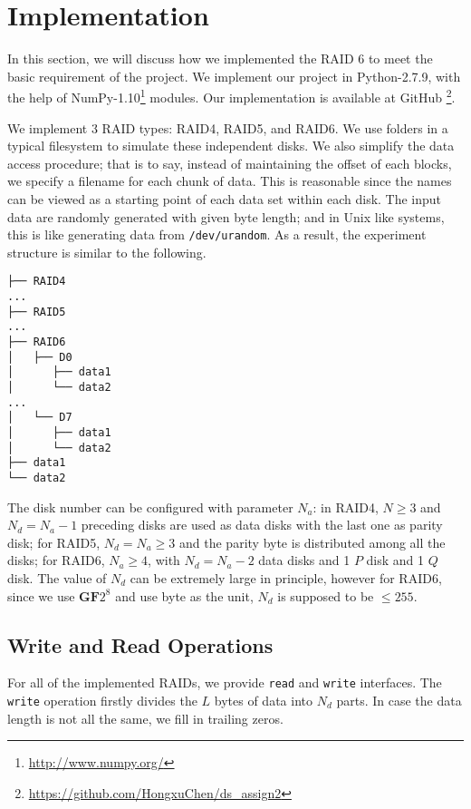\section{Implementation}

In this section, we will discuss how we implemented the RAID 6 to meet the basic requirement of the project.
We implement our project in Python-2.7.9, with the help of NumPy-1.10\footnote{\url{http://www.numpy.org/}} modules. Our implementation is available at GitHub \footnote{\url{https://github.com/HongxuChen/ds_assign2}}.

We implement 3 RAID types: RAID4, RAID5, and RAID6. We use folders in a typical filesystem to simulate these independent disks. We also simplify the data access procedure; that is to say, instead of maintaining the offset of each blocks, we specify a filename for each chunk of data. This is reasonable since the names can be viewed as a starting point of each data set within each disk. The input data are randomly generated with given byte length; and in Unix like systems, this is like generating data from \verb|/dev/urandom|. As a result, the experiment structure is similar to the following.

\begin{verbatim}
├── RAID4
...
├── RAID5
...
├── RAID6
│   ├── D0
│      ├── data1
│      └── data2
...
│   └── D7
│      ├── data1
│      └── data2
├── data1
└── data2

\end{verbatim}

The disk number can be configured with parameter $N_{a}$: in RAID4, $N\ge 3$ and $N_{d}=N_{a}-1$ preceding disks are used as data disks with the last one as parity disk; for RAID5, $N_{d}=N_{a}\ge 3$ and the parity byte is distributed among all the disks;  for RAID6, $N_{a}\ge 4$, with $N_{d}=N_{a}-2$ data disks and 1 $P$ disk and 1 $Q$ disk. The value of $N_{d}$ can be extremely large in principle, however for RAID6, since we use $\mathbf{GF}2^8$ and use byte as the unit, $N_{d}$ is supposed to be $\le 255$.

\subsection{Write and Read Operations}

For all of the implemented RAIDs, we provide \verb|read| and \verb|write| interfaces. The \verb|write| operation firstly divides the $L$ bytes of data into $N_d$ parts. In case the data length is not all the same, we fill in trailing zeros. 

